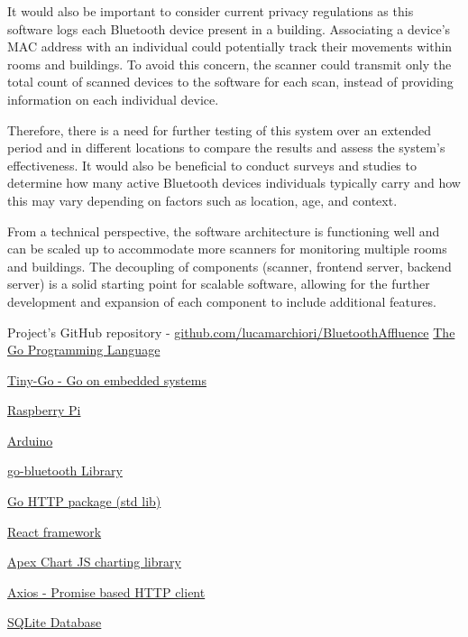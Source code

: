 \documentclass[a4paper, 11pt]{article}
\begin{document}
It would also be important to consider current privacy regulations as this software logs each Bluetooth device present in a building. Associating a device's MAC address with an individual could potentially track their movements within rooms and buildings. To avoid this concern, the scanner could transmit only the total count of scanned devices to the software for each scan, instead of providing information on each individual device.

Therefore, there is a need for further testing of this system over an extended period and in different locations to compare the results and assess the system's effectiveness. It would also be beneficial to conduct surveys and studies to determine how many active Bluetooth devices individuals typically carry and how this may vary depending on factors such as location, age, and context.

From a technical perspective, the software architecture is functioning well and can be scaled up to accommodate more scanners for monitoring multiple rooms and buildings. The decoupling of components (scanner, frontend server, backend server) is a solid starting point for scalable software, allowing for the further development and expansion of each component to include additional features.


\newpage
\begin{thebibliography}{9}
Project's GitHub repository - \href{https://github.com/lucamarchiori/BluetoothAffluence}{github.com/lucamarchiori/BluetoothAffluence}
\href{https://go.dev/}{The Go Programming Language}

\href{https://tinygo.org/}{Tiny-Go - Go on embedded systems}

\href{https://www.raspberrypi.com/documentation/computers/raspberry-pi.html}{Raspberry Pi}

\href{https://docs.arduino.cc/}{Arduino}

\href{https://pkg.go.dev/github.com/muka/go-bluetooth@v0.0.0-20221213043340-85dc80edc4e1#section-readme}{go-bluetooth Library}

\href{https://pkg.go.dev/net/http}{Go HTTP package (std lib)}

\href{https://react.dev/}{React framework}

\href{https://apexcharts.com/}{Apex Chart JS charting library}

\href{https://axios-http.com/}{Axios - Promise based HTTP client}

\href{https://www.sqlite.org/index.html}{SQLite Database}
\end{thebibliography}
\end{document}
